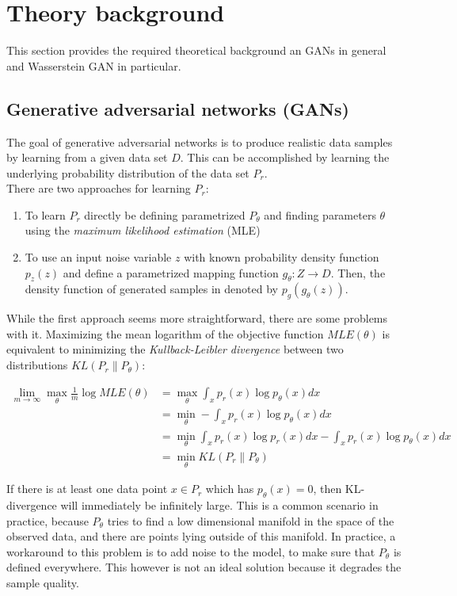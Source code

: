 \section{Theory background}
This section provides the required theoretical background an GANs in general and Wasserstein GAN in particular. 
\subsection{Generative adversarial networks (GANs)}
The goal of generative adversarial networks is to produce realistic data samples by learning from a given data set $D$. This can be accomplished by learning the underlying probability distribution of the data set $P_r$.\\
\indent There are two approaches for learning $P_r$:
\begin{enumerate}
	\item To learn $P_r$ directly be defining parametrized $P_\theta$ and finding parameters $\theta$ using the \textit{maximum likelihood estimation} (MLE)
	\item To use an input noise variable $z$ with known probability density function $p_z(z)$ and define a parametrized mapping function $g_\theta: Z \rightarrow D$. Then, the density function of generated samples in denoted by $p_g(g_\theta(z))$. 
\end{enumerate}

While the first approach seems more straightforward, there are some problems with it. Maximizing the mean logarithm of the objective function $MLE(\theta)$ is equivalent to minimizing the \textit{Kullback-Leibler divergence} between two distributions $KL(P_r \lVert P_\theta)$:

\begin{align*}
	\lim_{m \to \infty} \max_{\theta} \frac{1}{m} \log MLE(\theta)
	&= \max_\theta \int_x p_r(x) \log p_\theta(x) dx \\
	&= \min_\theta - \int_x p_r(x) \log p_\theta(x) dx \\
	&= \min_\theta \int_x p_r(x) \log p_r(x) dx - \int_x p_r(x) \log p_\theta(x) dx \\
	&= \min_\theta KL(P_r \lVert P_\theta)
\end{align*}

If there is at least one data point $x \in P_r$ which has $p_\theta(x) = 0$, then KL-divergence will immediately be infinitely large. This is a common scenario in practice, because $P_\theta$ tries to find a low dimensional manifold in the space of the observed data, and there are points lying outside of this manifold. In practice, a workaround to this problem is to add noise to the model, to make sure that $P_\theta$ is defined everywhere. This however is not an ideal solution because it degrades the sample quality. \\
  
